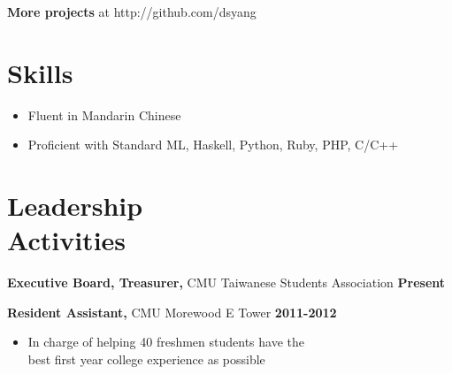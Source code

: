 \documentclass[sectioned]{dsyangres}
\begin{document}
\begin{resume}
\textbf{More projects} at http://github.com/dsyang

\section{Skills}

\begin{itemize} \itemsep -2pt
  \item Fluent in Mandarin Chinese
  \item Proficient with Standard ML, Haskell, Python, Ruby, PHP, C/C++
\end{itemize}

\section{Leadership \\ Activities}

\textbf{Executive Board, Treasurer,} CMU Taiwanese Students
  Association \hfill \textbf{ Present}

\textbf{Resident Assistant,} CMU Morewood E Tower \hfill \textbf{2011-2012}
  \begin{itemize} \itemsep -2pt
    \item In charge of helping 40 freshmen students have the\\ best
      first year college experience as possible
  \end{itemize}


\end{resume}
\end{document}

